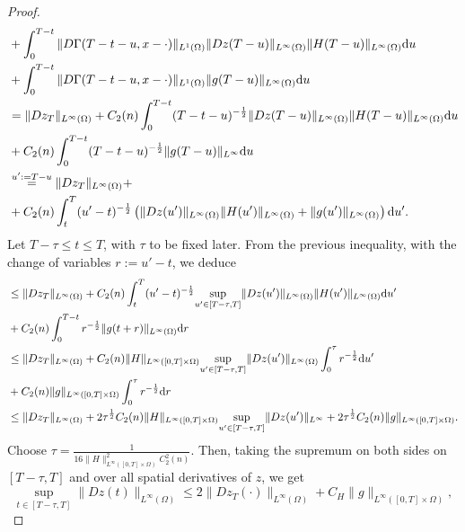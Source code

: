\documentclass[10pt,a4paper,nouppercase,nowrite]{article}
\numberwithin{equation}{section}
\newcommand{\di}{{\rm d}}
\theoremstyle{definition}
\begin{document}
\begin{proof}
\begin{equation*}
\begin{split}
			&+ \int_0^{T-t} \| D\Gamma(T-t-u,x-\cdot) \|_{L^1(\Omega)} \| Dz(T-u) \|_{L^{\infty}(\Omega)} \| H(T-u) \|_{L^{\infty}(\Omega)} \di u \\
			&+ \int_0^{T-t} \| D\Gamma(T-t-u,x-\cdot) \|_{L^1(\Omega)} \| g(T-u) \|_{L^{\infty}(\Omega)} \di u \\
			&= \| Dz_T \|_{L^{\infty}(\Omega)} + C_2(n) \int_{0}^{T-t}  (T-t-u)^{-\frac{1}{2}} \| Dz(T-u) \|_{L^{\infty}(\Omega)} \| H(T-u) \|_{L^{\infty}(\Omega)} \di u \\
			&+ C_2(n) \int_{0}^{T-t}  (T-t-u)^{-\frac{1}{2}} \| g(T-u) \|_{L^{\infty}} \di u \\
			&\overset{u':=T-u}{=} \| Dz_T \|_{L^{\infty}(\Omega)} + \\
			&+C_2(n) \int_t^T (u'-t)^{-\frac{1}{2}} \left( \| Dz(u') \|_{L^{\infty}(\Omega)} \| H(u') \|_{L^{\infty}(\Omega)} + \| g(u') \|_{L^{\infty}(\Omega)} \right) \di u'.
			\end{split}
		\end{equation*}
		Let $T-\tau \le t \le T$, with $\tau$ to be fixed later. From the previous inequality, with the change of variables $r:=u'-t$, we deduce
		\begin{equation*}
			\begin{split}
			&\le \| Dz_T \|_{L^{\infty}(\Omega)} + C_2(n) \int_t^T (u'-t)^{-\frac{1}{2}} \underset{u' \in [T-\tau,T]}{\sup} \| Dz(u') \|_{L^{\infty}(\Omega)} \| H(u') \|_{L^{\infty}(\Omega)} \di u' \\
			&+C_2(n) \int_0^{T-t} r^{-\frac{1}{2}} \| g(t+r) \|_{L^{\infty}(\Omega)} \di r \\
			&\le \| Dz_T \|_{L^{\infty}(\Omega)} + C_2(n) \| H \|_{L^{\infty}([0,T] \times \Omega)} \underset{u' \in [T-\tau,T]}{\sup} \| Dz(u') \|_{L^{\infty}(\Omega)} \int_0^{\tau} r^{-\frac{1}{2}} \di u' \\
			&+C_2(n) \| g \|_{L^{\infty}([0,T] \times \Omega)} \int_0^{\tau} r^{-\frac{1}{2}} \di r  \\
			&\le \| Dz_T \|_{L^{\infty}(\Omega)} + 2 \tau^{\frac{1}{2}} C_2(n) \| H \|_{L^{\infty}([0,T] \times \Omega)} \underset{u' \in [T-\tau,T]}{\sup} \| Dz(u') \|_{L^{\infty}} + 2 \tau^{\frac{1}{2}} C_2(n) \| g \|_{L^{\infty}([0,T] \times \Omega)}.
			\end{split}
		\end{equation*}
		Choose $\tau=\frac{1}{16 \| H \|^2_{L^{\infty}([0,T] \times \Omega)} C_2^2(n)}$. Then, taking the supremum on both sides on $[T-\tau,T]$ and over all spatial derivatives of $z$, we get
		$$\underset{t \in [T-\tau,T]}{\sup} \| Dz(t) \|_{L^{\infty}(\Omega)} \le 2 \| Dz_T(\cdot) \|_{L^{\infty}(\Omega)} + C_H \| g \|_{L^{\infty}([0,T] \times \Omega)},$$

\end{proof}
\end{document}
